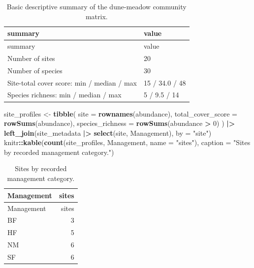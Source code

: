 \documentclass[
  english,
]{article}
\newenvironment{Shaded}{\begin{snugshade}}{\end{snugshade}}
\newcommand{\AttributeTok}[1]{\textcolor[rgb]{0.13,0.29,0.53}{#1}}
\newcommand{\DecValTok}[1]{\textcolor[rgb]{0.00,0.00,0.81}{#1}}
\newcommand{\FunctionTok}[1]{\textcolor[rgb]{0.13,0.29,0.53}{\textbf{#1}}}
\newcommand{\NormalTok}[1]{#1}
\newcommand{\OtherTok}[1]{\textcolor[rgb]{0.56,0.35,0.01}{#1}}
\newcommand{\SpecialCharTok}[1]{\textcolor[rgb]{0.81,0.36,0.00}{\textbf{#1}}}
\newcommand{\StringTok}[1]{\textcolor[rgb]{0.31,0.60,0.02}{#1}}
\begin{document}
\begin{longtable}[]{@{}ll@{}}
\caption{Basic descriptive summary of the dune-meadow community
matrix.}\tabularnewline
\toprule\noalign{}
summary & value \\
\midrule\noalign{}
\endfirsthead
\toprule\noalign{}
summary & value \\
\midrule\noalign{}
\endhead
\bottomrule\noalign{}
\endlastfoot
Number of sites & 20 \\
Number of species & 30 \\
Site-total cover score: min / median / max & 15 / 34.0 / 48 \\
Species richness: min / median / max & 5 / 9.5 / 14 \\
\end{longtable}

\begin{Shaded}
\begin{Highlighting}[]
\NormalTok{site\_profiles }\OtherTok{\textless{}{-}} \FunctionTok{tibble}\NormalTok{(}
  \AttributeTok{site =} \FunctionTok{rownames}\NormalTok{(abundance),}
  \AttributeTok{total\_cover\_score =} \FunctionTok{rowSums}\NormalTok{(abundance),}
  \AttributeTok{species\_richness =} \FunctionTok{rowSums}\NormalTok{(abundance }\SpecialCharTok{\textgreater{}} \DecValTok{0}\NormalTok{)}
\NormalTok{) }\SpecialCharTok{|\textgreater{}} \FunctionTok{left\_join}\NormalTok{(site\_metadata }\SpecialCharTok{|\textgreater{}} \FunctionTok{select}\NormalTok{(site, Management), }\AttributeTok{by =} \StringTok{"site"}\NormalTok{)}
\NormalTok{knitr}\SpecialCharTok{::}\FunctionTok{kable}\NormalTok{(}\FunctionTok{count}\NormalTok{(site\_profiles, Management, }\AttributeTok{name =} \StringTok{"sites"}\NormalTok{), }\AttributeTok{caption =} \StringTok{"Sites by recorded management category."}\NormalTok{)}
\end{Highlighting}
\end{Shaded}

\begin{longtable}[]{@{}lr@{}}
\caption{Sites by recorded management category.}\tabularnewline
\toprule\noalign{}
Management & sites \\
\midrule\noalign{}
\endfirsthead
\toprule\noalign{}
Management & sites \\
\midrule\noalign{}
\endhead
\bottomrule\noalign{}
\endlastfoot
BF & 3 \\
HF & 5 \\
NM & 6 \\
SF & 6 \\
\end{longtable}
\end{document}
